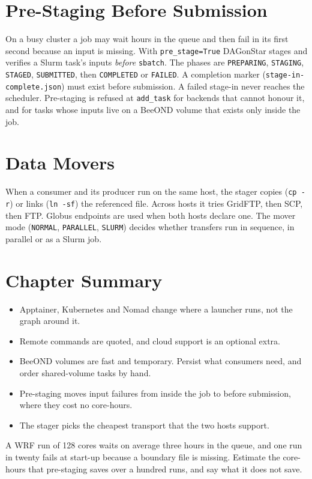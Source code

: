 \section{Pre-Staging Before Submission}

On a busy cluster a job may wait hours in the queue and then fail in its
first second because an input is missing. With \texttt{pre\_stage=True}
DAGonStar stages and verifies a Slurm task's inputs \emph{before}
\texttt{sbatch}. The phases are \texttt{PREPARING}, \texttt{STAGING},
\texttt{STAGED}, \texttt{SUBMITTED}, then \texttt{COMPLETED} or
\texttt{FAILED}. A completion marker (\texttt{stage-in-complete.json}) must
exist before submission. A failed stage-in never reaches the scheduler.
Pre-staging is refused at \texttt{add\_task} for backends that cannot honour
it, and for tasks whose inputs live on a BeeOND volume that exists only inside
the job.





\section{Data Movers}

When a consumer and its producer run on the same host, the stager copies
(\texttt{cp -r}) or links (\texttt{ln -sf}) the referenced file. Across hosts
it tries GridFTP, then SCP, then FTP. Globus endpoints are used when both
hosts declare one. The mover mode (\texttt{NORMAL}, \texttt{PARALLEL},
\texttt{SLURM}) decides whether transfers run in sequence, in parallel or as
a Slurm job.



\section{Chapter Summary}

\begin{itemize}[leftmargin=1.4em]
  \item Apptainer, Kubernetes and Nomad change where a launcher runs, not the
    graph around it.
  \item Remote commands are quoted, and cloud support is an optional extra.
  \item BeeOND volumes are fast and temporary. Persist what consumers need,
    and order shared-volume tasks by hand.
  \item Pre-staging moves input failures from inside the job to before
    submission, where they cost no core-hours.
  \item The stager picks the cheapest transport that the two hosts support.
\end{itemize}

\begin{exercise}
A WRF run of 128 cores waits on average three hours in the queue, and one run
in twenty fails at start-up because a boundary file is missing. Estimate the
core-hours that pre-staging saves over a hundred runs, and say what it does
not save.
\end{exercise}
